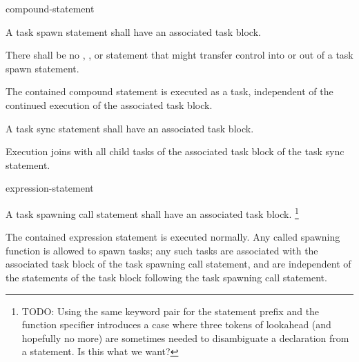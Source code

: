 
\begin{bnf}
\br
{}  compound-statement
\end{bnf}


\pnum
A task spawn statement shall have an associated task block.

\pnum
There shall be no
,
,
or
statement that might transfer control into or out of
a task spawn statement.

\pnum
The contained compound statement is executed as a task,
independent of the continued execution
of the associated task block.


\begin{bnf}
\br
{}  \terminal{;}
\end{bnf}


\pnum
A task sync statement shall have an associated task block.

\pnum
Execution joins with
all child tasks of the associated task block
of the task sync statement.

\begin{bnf}
\br
{}  expression-statement
\end{bnf}

\pnum
A task spawning call statement shall have an associated task block.
\footnote{TODO:
Using the same keyword pair
for the statement prefix and the function specifier
introduces a case where three tokens of lookahead
(and hopefully no more)
are sometimes needed
to disambiguate a declaration from a statement.
Is this what we want?
}


\pnum
The contained expression statement is executed normally.
Any called spawning function is allowed to spawn tasks;
any such tasks are associated with the associated task block
of the task spawning call statement,
and are
independent of
the statements of the task block
following the task spawning call statement.

